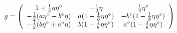 \begin{equation}
g=\left(\begin{array}{ccc}
1+{1\over 4}\eta\eta^\diamond&-{1\over 2}\eta&{1\over 
2}\eta^\diamond\\
-{1\over 2}(a\eta^\diamond-b^\diamond\eta)&a(1-{1\over
  8}\eta\eta^\diamond)&-
b^\diamond(1-{1\over 8}\eta\eta^\diamond)\\
-{1\over 2}(b\eta^\diamond+a^\diamond\eta)&b(1-{1\over
  8}\eta\eta^\diamond)& 
a^\diamond(1-{1\over 8}\eta\eta^\diamond)
\end{array}\right)
\end{equation}

